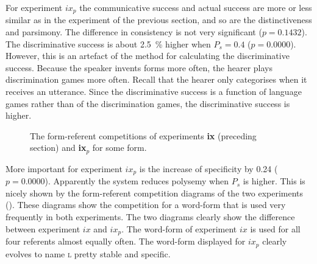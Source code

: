 For experiment {$ix_p$} the communicative success and actual success are more or less similar as in the experiment of the previous section, and so are the distinctiveness and parsimony. The difference in consistency is not very significant ($p=0.1432$). The discriminative success is about 2.5~\% higher when $P_s=0.4$ ($p=0.0000$). However, this is an artefact of the method for calculating the discriminative success. Because the speaker invents forms more often, the hearer plays discrimination games more often. Recall that the hearer only categorises when it receives an utterance. Since the discriminative success is a function of language games rather than of the discrimination games, the discriminative success is higher.

\begin{figure}[t]
\centering
{}
\caption{The form-referent competitions of experiments {\bf ix} (preceding section) and {\bf ix$_p$} for some form.}
\label{f:par:FR-comp}
\end{figure}

More important for experiment $ix_p$ is the increase of specificity by 0.24 ($p=0.0000$). Apparently the system reduces polysemy when $P_s$ is higher. This is nicely shown by the form-referent competition diagrams of the two experiments (). These diagrams show the competition for a word-form that is used very frequently in both experiments. The two diagrams clearly show the difference between experiment $ix$ and $ix_p$. The word-form of experiment $ix$ is used for all four referents almost equally often. The word-form displayed for $ix_p$ clearly evolves to name {\scshape l} pretty stable and specific.

